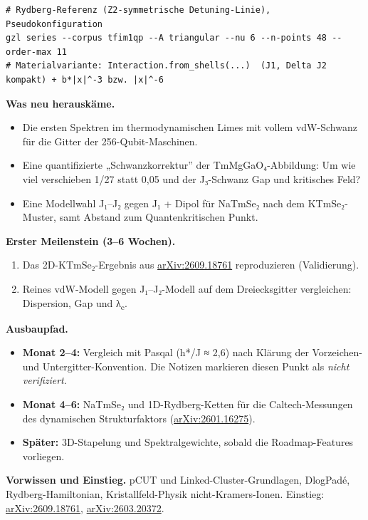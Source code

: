 \begin{verbatim}
# Rydberg-Referenz (Z2-symmetrische Detuning-Linie), Pseudokonfiguration
gzl series --corpus tfim1qp --A triangular --nu 6 --n-points 48 --order-max 11
# Materialvariante: Interaction.from_shells(...)  (J1, Delta J2 kompakt) + b*|x|^-3 bzw. |x|^-6
\end{verbatim}

\textbf{Was neu herauskäme.}

\begin{itemize}
\tightlist
\item
  Die ersten Spektren im thermodynamischen Limes mit vollem vdW-Schwanz für die Gitter der 256-Qubit-Maschinen.
\item
  Eine quantifizierte „Schwanzkorrektur'' der TmMgGaO₄-Abbildung: Um wie viel verschieben 1/27 statt 0,05 und der J₃-Schwanz Gap und kritisches Feld?
\item
  Eine Modellwahl J₁--J₂ gegen J₁ + Dipol für NaTmSe₂ nach dem KTmSe₂-Muster, samt Abstand zum Quantenkritischen Punkt.
\end{itemize}

\textbf{Erster Meilenstein (3--6 Wochen).}

\begin{enumerate}
\def\labelenumi{\arabic{enumi}.}
\tightlist
\item
  Das 2D-KTmSe₂-Ergebnis aus \href{https://arxiv.org/html/2609.18761}{arXiv:2609.18761} reproduzieren (Validierung).
\item
  Reines vdW-Modell gegen J₁--J₂-Modell auf dem Dreiecksgitter vergleichen: Dispersion, Gap und λ\textsubscript{c}.
\end{enumerate}

\textbf{Ausbaupfad.}

\begin{itemize}
\tightlist
\item
  \textbf{Monat 2--4:} Vergleich mit Pasqal (h*/J ≈ 2,6) nach Klärung der Vorzeichen- und Untergitter-Konvention. Die Notizen markieren diesen Punkt als \emph{nicht verifiziert}.
\item
  \textbf{Monat 4--6:} NaTmSe₂ und 1D-Rydberg-Ketten für die Caltech-Messungen des dynamischen Strukturfaktors (\href{https://arxiv.org/abs/2601.16275}{arXiv:2601.16275}).
\item
  \textbf{Später:} 3D-Stapelung und Spektralgewichte, sobald die Roadmap-Features vorliegen.
\end{itemize}

\textbf{Vorwissen und Einstieg.} pCUT und Linked-Cluster-Grundlagen, DlogPadé, Rydberg-Hamiltonian, Kristallfeld-Physik nicht-Kramers-Ionen. Einstieg: \href{https://arxiv.org/html/2609.18761}{arXiv:2609.18761}, \href{https://arxiv.org/abs/2603.20372}{arXiv:2603.20372}.

